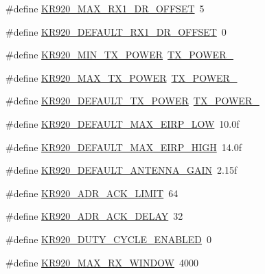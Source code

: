 \begin{DoxyCompactItemize}
\item 
\#define \hyperlink{group__REGIONKR920_ga3320f5d61b1846808a88a6d6c195a655}{K\+R920\+\_\+\+M\+A\+X\+\_\+\+R\+X1\+\_\+\+D\+R\+\_\+\+O\+F\+F\+S\+ET}~5
\item 
\#define \hyperlink{group__REGIONKR920_ga5da7ad3641edddb4a2160e9c8dd927e8}{K\+R920\+\_\+\+D\+E\+F\+A\+U\+L\+T\+\_\+\+R\+X1\+\_\+\+D\+R\+\_\+\+O\+F\+F\+S\+ET}~0
\item 
\#define \hyperlink{group__REGIONKR920_gab7d15217c552fe7d9acbef2e18d773a4}{K\+R920\+\_\+\+M\+I\+N\+\_\+\+T\+X\+\_\+\+P\+O\+W\+ER}~\hyperlink{group__REGION_ga3c7bd9a98f0c1e7e9aaa90857c4bd700}{T\+X\+\_\+\+P\+O\+W\+E\+R\+\_}
\item 
\#define \hyperlink{group__REGIONKR920_ga83f7aad24311983622b179a74c3c80d0}{K\+R920\+\_\+\+M\+A\+X\+\_\+\+T\+X\+\_\+\+P\+O\+W\+ER}~\hyperlink{group__REGION_gab33618449f2a573142c463ab071ef8ed}{T\+X\+\_\+\+P\+O\+W\+E\+R\+\_}
\item 
\#define \hyperlink{group__REGIONKR920_ga2d050aba7ed77d79eb65e2be94ca9abe}{K\+R920\+\_\+\+D\+E\+F\+A\+U\+L\+T\+\_\+\+T\+X\+\_\+\+P\+O\+W\+ER}~\hyperlink{group__REGION_gab33618449f2a573142c463ab071ef8ed}{T\+X\+\_\+\+P\+O\+W\+E\+R\+\_}
\item 
\#define \hyperlink{group__REGIONKR920_gaa1089d31d3ed0d917ca83b1d380c0f3a}{K\+R920\+\_\+\+D\+E\+F\+A\+U\+L\+T\+\_\+\+M\+A\+X\+\_\+\+E\+I\+R\+P\+\_\+\+L\+OW}~10.\+0f
\item 
\#define \hyperlink{group__REGIONKR920_ga616f9bdfacc11e6345f7fb99f0c19471}{K\+R920\+\_\+\+D\+E\+F\+A\+U\+L\+T\+\_\+\+M\+A\+X\+\_\+\+E\+I\+R\+P\+\_\+\+H\+I\+GH}~14.\+0f
\item 
\#define \hyperlink{group__REGIONKR920_gae51311387812d676bdc5dea935791713}{K\+R920\+\_\+\+D\+E\+F\+A\+U\+L\+T\+\_\+\+A\+N\+T\+E\+N\+N\+A\+\_\+\+G\+A\+IN}~2.\+15f
\item 
\#define \hyperlink{group__REGIONKR920_ga6950b0a2c12046467e541efc0738c58c}{K\+R920\+\_\+\+A\+D\+R\+\_\+\+A\+C\+K\+\_\+\+L\+I\+M\+IT}~64
\item 
\#define \hyperlink{group__REGIONKR920_gad06060e2fefe5ba46e3015555759a088}{K\+R920\+\_\+\+A\+D\+R\+\_\+\+A\+C\+K\+\_\+\+D\+E\+L\+AY}~32
\item 
\#define \hyperlink{group__REGIONKR920_ga397c5cdfee65398f7e9c7a47180cc0b2}{K\+R920\+\_\+\+D\+U\+T\+Y\+\_\+\+C\+Y\+C\+L\+E\+\_\+\+E\+N\+A\+B\+L\+ED}~0
\item 
\#define \hyperlink{group__REGIONKR920_ga5e1950b2db0cb9812585e3350cad623a}{K\+R920\+\_\+\+M\+A\+X\+\_\+\+R\+X\+\_\+\+W\+I\+N\+D\+OW}~4000

\end{DoxyCompactItemize}
